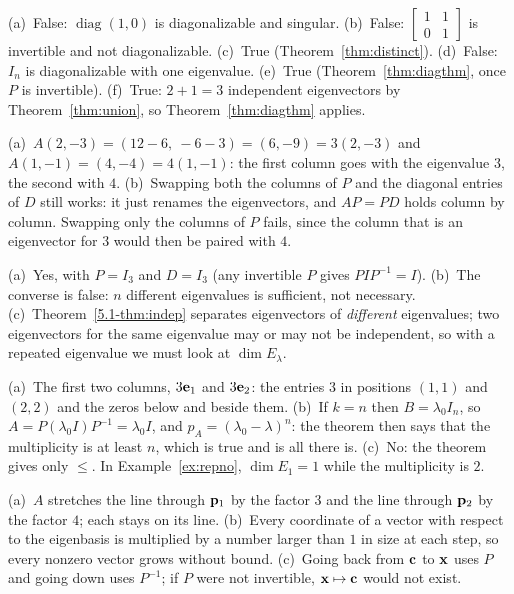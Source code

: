\documentclass[11pt]{article}
\begin{document}
\begin{description}[leftmargin=0pt,itemsep=5pt]
  \item[Knowledge Check \ref{kc:tf}.] (a)~False: $\operatorname{diag}(1,0)$ is diagonalizable and singular. (b)~False: $\begin{bmatrix}1&1\\0&1\end{bmatrix}$ is invertible and not diagonalizable. (c)~True (Theorem~\ref{thm:distinct}). (d)~False: $I_n$ is diagonalizable with one eigenvalue. (e)~True (Theorem~\ref{thm:diagthm}, once $P$ is invertible). (f)~True: $2+1=3$ independent eigenvectors by Theorem~\ref{thm:union}, so Theorem~\ref{thm:diagthm} applies.
  \item[Pause and think \ref{think:cols}.] (a)~$A(2,-3)=(12-6,\ -6-3)=(6,-9)=3(2,-3)$ and $A(1,-1)=(4,-4)=4(1,-1)$: the first column goes with the eigenvalue $3$, the second with $4$. (b)~Swapping both the columns of $P$ and the diagonal entries of $D$ still works: it just renames the eigenvectors, and $AP=PD$ holds column by column. Swapping only the columns of $P$ fails, since the column that is an eigenvector for $3$ would then be paired with $4$.
  \item[Pause and think \ref{think:suff}.] (a)~Yes, with $P=I_3$ and $D=I_3$ (any invertible $P$ gives $P I P^{-1}=I$). (b)~The converse is false: $n$ different eigenvalues is sufficient, not necessary. (c)~Theorem~\ref{5.1-thm:indep} separates eigenvectors of \emph{different} eigenvalues; two eigenvectors for the same eigenvalue may or may not be independent, so with a repeated eigenvalue we must look at $\dim E_\lambda$.
  \item[Pause and think \ref{think:whybound}.] (a)~The first two columns, $3\mathbf{e}_1$ and $3\mathbf{e}_2$: the entries $3$ in positions $(1,1)$ and $(2,2)$ and the zeros below and beside them. (b)~If $k=n$ then $B=\lambda_0I_n$, so $A=P(\lambda_0I)P^{-1}=\lambda_0I$, and $p_A=(\lambda_0-\lambda)^n$: the theorem then says that the multiplicity is at least $n$, which is true and is all there is. (c)~No: the theorem gives only $\le$. In Example~\ref{ex:repno}, $\dim E_1=1$ while the multiplicity is $2$.
  \item[Pause and think \ref{think:lines}.] (a)~$A$ stretches the line through $\mathbf{p}_1$ by the factor $3$ and the line through $\mathbf{p}_2$ by the factor $4$; each stays on its line. (b)~Every coordinate of a vector with respect to the eigenbasis is multiplied by a number larger than $1$ in size at each step, so every nonzero vector grows without bound. (c)~Going back from $\mathbf{c}$ to $\mathbf{x}$ uses $P$ and going down uses $P^{-1}$; if $P$ were not invertible, $\mathbf{x}\mapsto\mathbf{c}$ would not exist.

\end{description}
\end{document}
